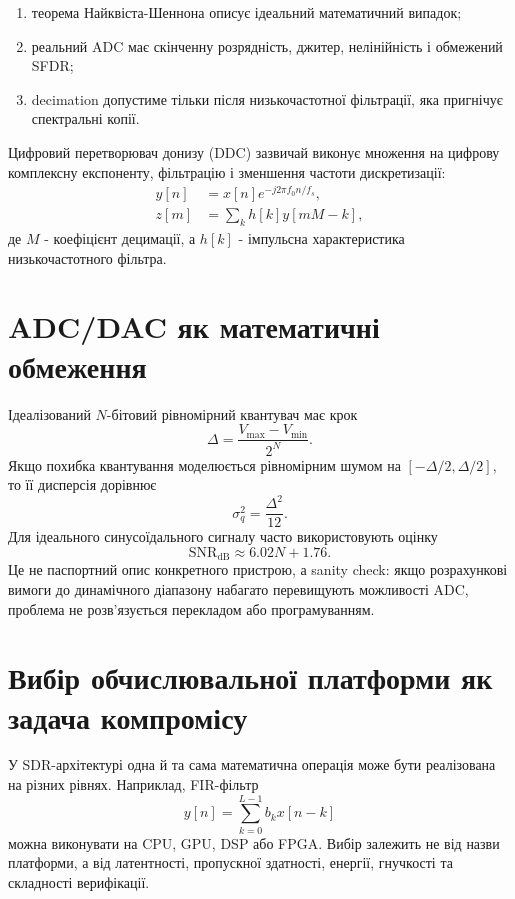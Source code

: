 \begin{enumerate}[label=\alph*)]
\item теорема Найквіста-Шеннона описує ідеальний математичний випадок;
\item реальний ADC має скінченну розрядність, джитер, нелінійність і обмежений SFDR;
\item decimation допустиме тільки після низькочастотної фільтрації, яка пригнічує спектральні копії.
\end{enumerate}

Цифровий перетворювач донизу (DDC) зазвичай виконує множення на цифрову комплексну експоненту, фільтрацію і зменшення частоти дискретизації:
\begin{align}
  y[n] &= x[n]e^{-j2\pi f_0 n/f_s},\\
  z[m] &= \sum_{k} h[k] y[mM-k],
\end{align}
де $M$ - коефіцієнт децимації, а $h[k]$ - імпульсна характеристика низькочастотного фільтра.

\section{ADC/DAC як математичні обмеження}

Ідеалізований $N$-бітовий рівномірний квантувач має крок
\begin{equation}
  \Delta = \frac{V_{\max}-V_{\min}}{2^N}.
\end{equation}
Якщо похибка квантування моделюється рівномірним шумом на $[-\Delta/2,\Delta/2]$, то її дисперсія дорівнює
\begin{equation}
  \sigma_q^2 = \frac{\Delta^2}{12}.
\end{equation}
Для ідеального синусоїдального сигналу часто використовують оцінку
\begin{equation}
  \mathrm{SNR}_{\mathrm{dB}} \approx 6.02N + 1.76.
\end{equation}
Це не паспортний опис конкретного пристрою, а sanity check: якщо розрахункові вимоги до динамічного діапазону набагато перевищують можливості ADC, проблема не розв'язується перекладом або програмуванням.

\section{Вибір обчислювальної платформи як задача компромісу}

У SDR-архітектурі одна й та сама математична операція може бути реалізована на різних рівнях. Наприклад, FIR-фільтр
\begin{equation}
  y[n] = \sum_{k=0}^{L-1} b_k x[n-k]
\end{equation}
можна виконувати на CPU, GPU, DSP або FPGA. Вибір залежить не від назви платформи, а від латентності, пропускної здатності, енергії, гнучкості та складності верифікації.


